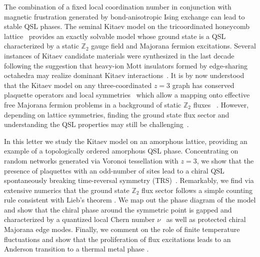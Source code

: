 \documentclass[%
 reprint,
superscriptaddress,
 amsmath,amssymb,
aps,
]{revtex4-2}
\begin{document}
The combination of a fixed local coordination number in conjunction with magnetic frustration generated by bond-anisotropic Ising exchange can lead to stable QSL phases. The seminal Kitaev model on the tricoordinated honeycomb lattice~\cite{kitaevAnyonsExactlySolved2006} provides an exactly solvable model whose ground state is a QSL characterized by a static $\mathbb Z_2$ gauge field and Majorana fermion excitations. 
Several instances of Kitaev candidate materials were synthesized in the last decade~\cite{Jackeli2009,HerrmannsAnRev2018,Winter2017,TrebstPhysRep2022,Takagi2019} following the suggestion that heavy-ion Mott insulators formed by edge-sharing octahedra may realize dominant Kitaev interactions~\cite{Jackeli2009}. 
%
It is by now understood that the Kitaev model on any three-coordinated $z=3$ graph has conserved plaquette operators and local symmetries~\cite{Baskaran2007,Baskaran2008} which allow a mapping onto effective free Majorana fermion problems in a background of static $\mathbb Z_2$ fluxes ~\cite{Nussinov2009,OBrienPRB2016,yaoExactChiralSpin2007,hermanns2015weyl}. However, depending on lattice symmetries, finding the ground state flux sector and understanding the QSL properties may still be challenging~\cite{eschmann2019thermodynamics,Peri2020}. 


In this letter we study the Kitaev model on an amorphous lattice, providing an example of a topologically ordered amorphous QSL phase. Concentrating on random networks generated via Voronoi tessellation \cite{mitchellAmorphousTopologicalInsulators2018,marsalTopologicalWeaireThorpeModels2020} with $z=3$, we show that the presence of plaquettes with an odd-number of sites lead to a chiral QSL spontaneously breaking time-reversal symmetry (TRS)~\cite{yaoExactChiralSpin2007,Chua2011,ChuaPRB2011,Fiete2012,Natori2016,Wu2009, WangHaoranPRB2021}. Remarkably, we find via extensive numerics that the ground state $\mathbb Z_2$ flux sector follows a simple counting rule consistent with Lieb's theorem \cite{lieb_flux_1994}. We map out the phase diagram of the model and show that the chiral phase around the symmetric point is gapped and characterized by a quantized local Chern number $\nu$~\cite{peru_preprint, mitchellAmorphousTopologicalInsulators2018} as well as protected chiral Majorana edge modes. Finally, we comment on the role of finite temperature fluctuations and show that the proliferation of flux excitations leads to an Anderson transition to a thermal metal phase \cite{Laumann2012,lahtinenTopologicalLiquidNucleation2012,selfThermallyInducedMetallic2019}. \par
\end{document}
